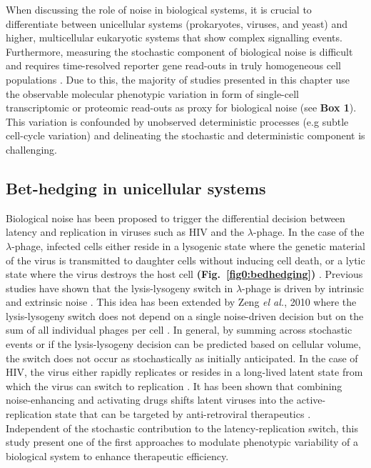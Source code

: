 \newpage

When discussing the role of noise in biological systems, it is crucial to differentiate between unicellular systems (prokaryotes, viruses, and yeast) and higher, multicellular eukaryotic systems that show complex signalling events. 
Furthermore, measuring the stochastic component of biological noise is difficult and requires time-resolved reporter gene read-outs in truly homogeneous cell populations \citep{Elowitz2002}. 
Due to this, the majority of studies presented in this chapter use the observable molecular phenotypic variation in form of single-cell transcriptomic or proteomic read-outs as proxy for biological noise (see \textbf{Box 1}). 
This variation is confounded by unobserved deterministic processes (e.g subtle cell-cycle variation) and delineating the stochastic and deterministic component is challenging.

\subsection{Bet-hedging in unicellular systems}

Biological noise has been proposed to trigger the differential decision between latency and replication in viruses such as \gls{HIV} and the $\lambda$-phage. 
In the case of the $\lambda$-phage, infected cells either reside in a lysogenic state where the genetic material of the virus is transmitted to daughter cells without inducing cell death, or a lytic state where the virus destroys the host cell \textbf{(Fig.~\ref{fig0:bedhedging})} \citep{Lieb1953}. 
Previous studies have shown that the lysis-lysogeny switch in $\lambda$-phage is driven by intrinsic and extrinsic noise \citep{Arkin1998, St-Pierre2008}. 
This idea has been extended by Zeng \textit{el al.}, 2010 where the lysis-lysogeny switch does not depend on a single noise-driven decision but on the sum of all individual phages per cell \citep{Zeng2010}. 
In general, by summing across stochastic events or if the lysis-lysogeny decision can be predicted based on cellular volume, the switch does not occur as stochastically as initially anticipated.
In the case of \Gls{HIV}, the virus either rapidly replicates or resides in a long-lived latent state from which the virus can switch to replication \citep{Weinberger2015}. 
It has been shown that combining noise-enhancing and activating drugs shifts latent viruses into the active-replication state that can be targeted by anti-retroviral therapeutics \citep{Dar2014}. 
Independent of the stochastic contribution to the latency-replication switch, this study present one of the first approaches to modulate phenotypic variability of a biological system to enhance therapeutic efficiency.\\

